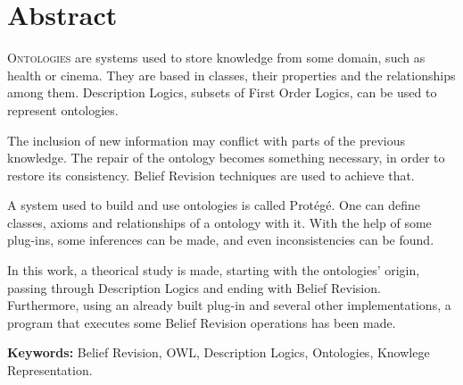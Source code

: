 \chapter*{Abstract}

\lettrine{O}{ntologies} are systems used to store knowledge from some domain, such as health or cinema. They are based in classes, their properties and the relationships among them. Description Logics, subsets of First Order Logics, can be used to represent ontologies.

The inclusion of new information may conflict with parts of the previous knowledge. The repair of the ontology becomes something necessary, in order to restore its consistency. Belief Revision techniques are used to achieve that.

A system used to build and use ontologies is called Protégé. One can define classes, axioms and relationships of a ontology with it. With the help of some plug-ins, some inferences can be made, and even inconsistencies can be found.

In this work, a theorical study is made, starting with the ontologies' origin, passing through Description Logics and ending with Belief Revision. Furthermore, using an already built plug-in and several other implementations, a program that executes some Belief Revision operations has been made.

\noindent \textbf{Keywords:} Belief Revision, OWL, Description Logics, Ontologies, Knowlege Representation.
